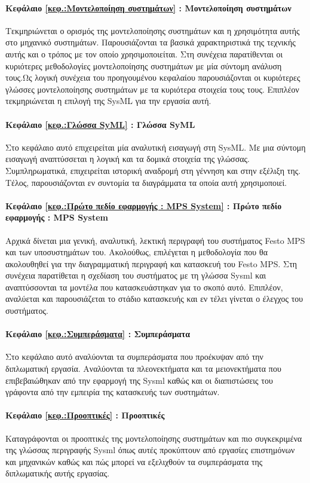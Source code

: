 \documentclass[a4paper,12pt,twoside]{report}
\begin{document}
		\paragraph{Κεφάλαιο \ref{κεφ.:Μοντελοποίηση συστημάτων} : Μοντελοποίηση συστημάτων} {Τεκμηριώνεται ο ορισμός της μοντελοποίησης συστημάτων και η χρησιμότητα αυτής στο μηχανικό συστημάτων. Παρουσιάζονται τα βασικά χαρακτηριστικά της τεχνικής αυτής και ο τρόπος με τον οποίο χρησιμοποιείται. Στη συνέχεια παρατίθενται οι κυριότερες μεθοδολογίες μοντελοποίησης συστημάτων με μία σύντομη ανάλυση τους.Ως λογική συνέχεια του προηγουμένου κεφαλαίου παρουσιάζονται οι κυριότερες γλώσσες  μοντελοποίησης συστημάτων με τα κυριότερα στοιχεία τους τους. Επιπλέον τεκμηριώνεται η επιλογή της SysML για την εργασία αυτή.
		}
		\paragraph{Κεφάλαιο \ref{κεφ.:Γλώσσα SyML} : Γλώσσα SyML} {Στο κεφάλαιο αυτό επιχειρείται μία αναλυτική εισαγωγή στη SysML. Με μια σύντομη εισαγωγή αναπτύσσεται η λογική και τα δομικά στοιχεία της γλώσσας. Συμπληρωματικά, επιχειρείται ιστορική αναδρομή στη γέννηση και στην εξέλιξη της. Τέλος, παρουσιάζονται εν συντομία τα διαγράμματα τα οποία αυτή χρησιμοποιεί.
		}
		\paragraph{Κεφάλαιο \ref{κεφ.:Πρώτο πεδίο εφαρμογής : MPS System} : Πρώτο πεδίο εφαρμογής : MPS System} {Αρχικά δίνεται μια γενική, αναλυτική, λεκτική περιγραφή του συστήματος Festo MPS και των υποσυστημάτων του. Ακολούθως, επιλέγεται η μεθοδολογία που θα ακολουθηθεί για την διαγραμματική περιγραφή και κατασκευή του Festo MPS. Στη συνέχεια παρατίθεται η σχεδίαση του συστήματος με τη γλώσσα Sysml και αναπτύσσονται τα μοντέλα που κατασκευάστηκαν για το σκοπό αυτό. Επιπλέον, αναλύεται και παρουσιάζεται το στάδιο κατασκευής και εν τέλει γίνεται ο έλεγχος του συστήματος.
		}
		\paragraph{Κεφάλαιο \ref{κεφ.:Συμπεράσματα} : Συμπεράσματα} {Στο κεφάλαιο αυτό αναλύονται τα συμπεράσματα που προέκυψαν από την διπλωματική εργασία. Αναλύονται τα πλεονεκτήματα και τα μειονεκτήματα που επιβεβαιώθηκαν από την εφαρμογή της Sysml καθώς και οι διαπιστώσεις του γράφοντα από την εμπειρία της κατασκευής των συστημάτων.
		}
		\paragraph{Κεφάλαιο \ref{κεφ.:Προοπτικές} : Προοπτικές} {Καταγράφονται οι προοπτικές της μοντελοποίησης συστημάτων και πιο συγκεκριμένα της γλώσσας περιγραφής Sysml όπως αυτές προκύπτουν από εργασίες επιστημόνων και μηχανικών καθώς και πώς μπορεί να εξελιχθούν τα συμπεράσματα της διπλωματικής αυτής εργασίας.
		}
\end{document}
